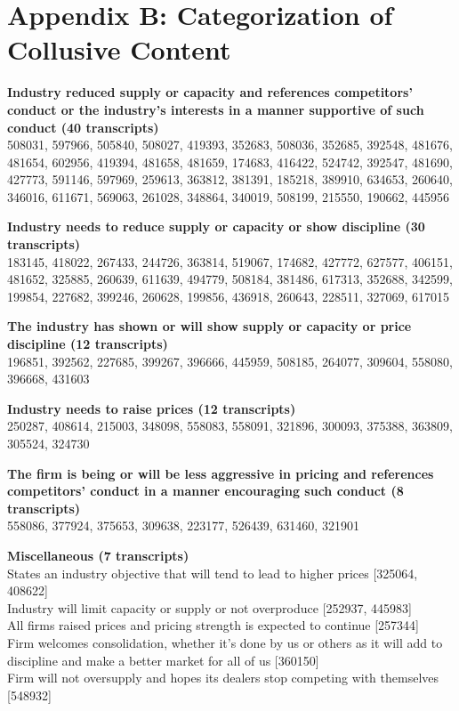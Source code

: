 \section*{Appendix B: Categorization of Collusive Content}

\textbf{Industry reduced supply or capacity and references competitors’ conduct or the industry’s interests in a manner supportive of such conduct (40 transcripts)} \\
508031, 597966, 505840, 508027, 419393, 352683, 508036, 352685, 392548, 481676, 481654, 602956, 419394, 481658, 481659, 174683, 416422, 524742, 392547, 481690, 427773, 591146, 597969, 259613, 363812, 381391, 185218, 389910, 634653, 260640, 346016, 611671, 569063, 261028, 348864, 340019, 508199, 215550, 190662, 445956

\textbf{Industry needs to reduce supply or capacity or show discipline (30 transcripts)} \\
183145, 418022, 267433, 244726, 363814, 519067, 174682, 427772, 627577, 406151, 481652, 325885, 260639, 611639, 494779, 508184, 381486, 617313, 352688, 342599, 199854, 227682, 399246, 260628, 199856, 436918, 260643, 228511, 327069, 617015

\textbf{The industry has shown or will show supply or capacity or price discipline (12 transcripts)} \\
196851, 392562, 227685, 399267, 396666, 445959, 508185, 264077, 309604, 558080, 396668, 431603

\textbf{Industry needs to raise prices (12 transcripts)} \\
250287, 408614, 215003, 348098, 558083, 558091, 321896, 300093, 375388, 363809, 305524, 324730

\textbf{The firm is being or will be less aggressive in pricing and references competitors’ conduct in a manner encouraging such conduct (8 transcripts)} \\
558086, 377924, 375653, 309638, 223177, 526439, 631460, 321901

\textbf{Miscellaneous (7 transcripts)} \\
States an industry objective that will tend to lead to higher prices [325064, 408622] \\
Industry will limit capacity or supply or not overproduce [252937, 445983] \\
All firms raised prices and pricing strength is expected to continue [257344] \\
Firm welcomes consolidation, whether it's done by us or others as it will add to discipline and make a better market for all of us [360150] \\
Firm will not oversupply and hopes its dealers stop competing with themselves [548932]